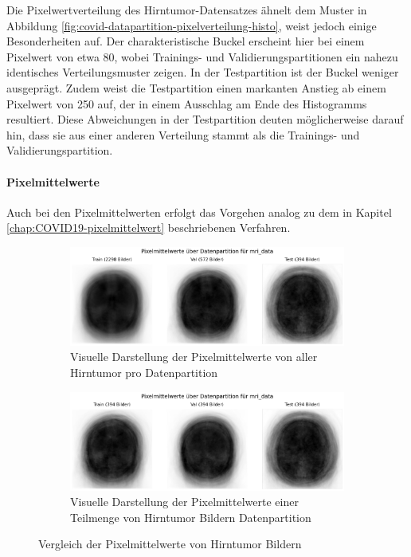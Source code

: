 Die Pixelwertverteilung des Hirntumor-Datensatzes ähnelt dem Muster in Abbildung \ref{fig:covid-datapartition-pixelverteilung-histo}, weist jedoch einige Besonderheiten auf. Der charakteristische Buckel erscheint hier bei einem Pixelwert von etwa 80, wobei Trainings- und Validierungspartitionen ein nahezu identisches Verteilungsmuster zeigen. In der Testpartition ist der Buckel weniger ausgeprägt. Zudem weist die Testpartition einen markanten Anstieg ab einem Pixelwert von 250 auf, der in einem Ausschlag am Ende des Histogramms resultiert. Diese Abweichungen in der Testpartition deuten möglicherweise darauf hin, dass sie aus einer anderen Verteilung stammt als die Trainings- und Validierungspartition.

\paragraph{Pixelmittelwerte} \label{chap:Differenzenbilder-TestProblemEda2-mri}
Auch bei den Pixelmittelwerten erfolgt das Vorgehen analog zu dem in Kapitel \ref{chap:COVID19-pixelmittelwert} beschriebenen Verfahren.

\begin{figure}[H]
    \centering
    \begin{subfigure}[b]{0.49\linewidth}
        \centering
        \includegraphics[width=\linewidth]{01-images/03-data/brain-pixelmittelwerte.png}
        \caption{Visuelle Darstellung der Pixelmittelwerte von aller Hirntumor pro Datenpartition}
        \label{fig:brain-pixelmittelwert-full}
    \end{subfigure}
    \hfill
    \begin{subfigure}[b]{0.49\linewidth}
        \centering
        \includegraphics[width=\linewidth]{01-images/03-data/brain-pixelmittelwert-subsample-train.png}
        \caption{Visuelle Darstellung der Pixelmittelwerte einer Teilmenge von Hirntumor Bildern Datenpartition}
        \label{fig:brain-pixelmittelwert-subsample}
    \end{subfigure}
    \caption{Vergleich der Pixelmittelwerte von Hirntumor Bildern}
    \label{fig:brain-pixelmittelwert-comparison}
\end{figure}

